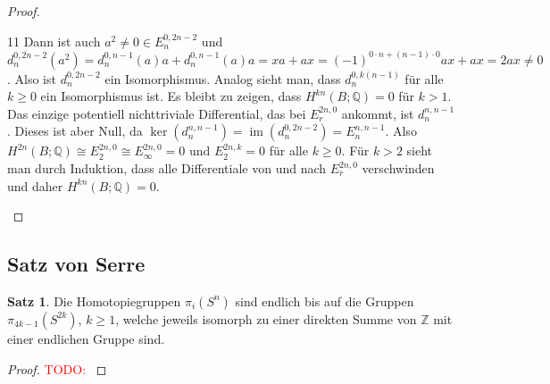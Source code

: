 \documentclass[11pt, a4paper, german]{article}
\theoremstyle{definition}
\newtheorem{satz}{Satz}
\theoremstyle{remark}
\newcommand{\TODO}[1]{\textcolor{red}{TODO: #1}} %
\newcommand{\Z}{\mathbb{Z}} %
\newcommand{\Q}{\mathbb{Q}} %
\DeclareMathOperator{\im}{im} %
\begin{document}
\begin{proof}
\begin{cutout}{0}{0pt}{\dimexpr\linewidth-5.5cm\relax}{11}
    Dann ist auch $a^2 \neq 0 \in E_n^{0,2n-2}$ und $d_n^{0,2n-2}(a^2) = d_n^{0,n-1}(a)a + d_n^{0,n-1}(a)a = xa + ax = (-1)^{0 \cdot n + (n-1) \cdot 0} ax + ax = 2ax \neq 0$.
    Also ist $d_n^{0,2n-2}$ ein Isomorphismus.
    Analog sieht man, dass $d_n^{0,k(n-1)}$ für alle $k \geq 0$ ein Isomorphismus ist.
    Es bleibt zu zeigen, dass $H^{kn}(B; \Q) = 0$ für $k > 1$.
    Das einzige potentiell nichttriviale Differential, das bei $E_r^{2n,0}$ ankommt, ist $d_n^{n,n-1}$.
    Dieses ist aber Null, da $\ker(d_n^{n,n-1}) = \im(d_n^{0,2n-2}) = E_n^{n,n-1}$.
    Also $H^{2n}(B; \Q) \cong E_2^{2n,0} \cong E_\infty^{2n,0} = 0$ und $E_2^{2n,k} = 0$ für alle $k \geq 0$.
    Für $k > 2$ sieht man durch Induktion, dass alle Differentiale von und nach $E_r^{2n,0}$ verschwinden und daher $H^{kn}(B; \Q) = 0$.
  \end{cutout}
\end{proof}

\subsection{Satz von Serre}

\begin{satz}
  Die Homotopiegruppen $\pi_i(S^n)$ sind endlich bis auf die Gruppen $\pi_{4k-1}(S^{2k})$, $k \geq 1$, welche jeweils isomorph zu einer direkten Summe von $\Z$ mit einer endlichen Gruppe sind.
\end{satz}

\begin{proof}
  \TODO{}
\end{proof}


\end{document}
